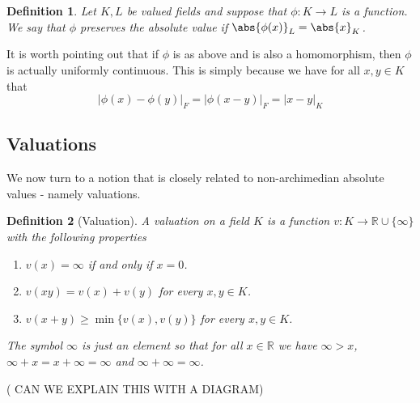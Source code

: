 \documentclass{article}
\newtheorem{definition}{Definition}[section]
\newtheorem{proposition}{Proposition}[section]
\newcommand{\mbb}[1]{\mathbb{#1}}
\numberwithin{equation}{section}
\begin{document}
\begin{definition}
    Let $K, L$ be valued fields and suppose that $\phi : K \to L$ is a function. We say that $\phi$ preserves the absolute value if $\abs{\phi(x)}_L = \abs{x}_K$.
\end{definition}

It is worth pointing out that if $\phi$ is as above and is also a homomorphism, then $\phi$ is actually uniformly continuous. This is simply because we have for all $x,y \in K$ that
$$|\phi(x) - \phi(y)|_F = |\phi(x-y)|_F = |x-y|_K$$




\subsection{Valuations}
We now turn to a notion that is closely related to non-archimedian absolute values - namely valuations.

\begin{definition}[Valuation]\label{def: Valuation}
    A valuation on a field $K$ is a function $v : K \to \mbb R \cup \{\infty\}$ with the following properties
    \begin{enumerate}
        \item $v(x) = \infty$ if and only if $x = 0$.
        \item $v(xy) = v(x) + v(y)$ for every $x,y \in K$.
        \item $v(x + y) \geq \min \{v(x), v(y)\}$ for every $x,y \in K$.
    \end{enumerate}
    The symbol $\infty$ is just an element so that for all $x \in \mbb R$ we have $\infty > x$,  $\infty + x = x + \infty = \infty$ and $\infty + \infty = \infty$.
\end{definition}

( CAN WE EXPLAIN THIS WITH A DIAGRAM)
\end{document}

